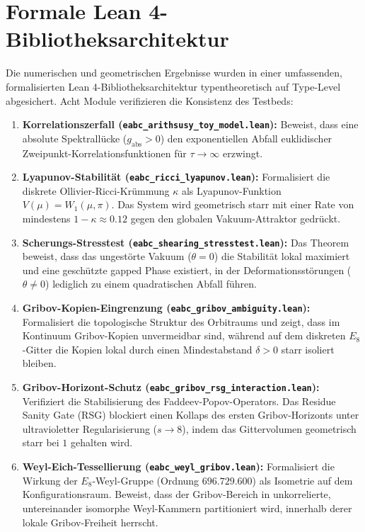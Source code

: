 \documentclass[11pt,a4paper]{article}
\begin{document}
	\section{Formale Lean 4-Bibliotheksarchitektur}
	Die numerischen und geometrischen Ergebnisse wurden in einer umfassenden, formalisierten Lean 4-Bibliotheksarchitektur typentheoretisch auf Type-Level abgesichert. Acht Module verifizieren die Konsistenz des Testbeds:
	\begin{enumerate}
		\item \textbf{Korrelationszerfall (\texttt{eabc\_arithsusy\_toy\_model.lean}):} Beweist, dass eine absolute Spektrallücke ($g_{\text{abs}} > 0$) den exponentiellen Abfall euklidischer Zweipunkt-Korrelationsfunktionen für $\tau \to \infty$ erzwingt.
		\item \textbf{Lyapunov-Stabilität (\texttt{eabc\_ricci\_lyapunov.lean}):} Formalisiert die diskrete Ollivier-Ricci-Krümmung $\kappa$ als Lyapunov-Funktion $V(\mu) = W_1(\mu, \pi)$. Das System wird geometrisch starr mit einer Rate von mindestens $1 - \kappa \approx 0.12$ gegen den globalen Vakuum-Attraktor gedrückt.
		\item \textbf{Scherungs-Stresstest (\texttt{eabc\_shearing\_stresstest.lean}):} Das Theorem beweist, dass das ungestörte Vakuum ($\theta = 0$) die Stabilität lokal maximiert und eine geschützte gapped Phase existiert, in der Deformationsstörungen ($\theta \neq 0$) lediglich zu einem quadratischen Abfall führen.
		\item \textbf{Gribov-Kopien-Eingrenzung (\texttt{eabc\_gribov\_ambiguity.lean}):} Formalisiert die topologische Struktur des Orbitraums und zeigt, dass im Kontinuum Gribov-Kopien unvermeidbar sind, während auf dem diskreten $E_8$-Gitter die Kopien lokal durch einen Mindestabstand $\delta > 0$ starr isoliert bleiben.
		\item \textbf{Gribov-Horizont-Schutz (\texttt{eabc\_gribov\_rsg\_interaction.lean}):} Verifiziert die Stabilisierung des Faddeev-Popov-Operators. Das Residue Sanity Gate (RSG) blockiert einen Kollaps des ersten Gribov-Horizonts unter ultravioletter Regularisierung ($s \to 8$), indem das Gittervolumen geometrisch starr bei $1$ gehalten wird.
		\item \textbf{Weyl-Eich-Tessellierung (\texttt{eabc\_weyl\_gribov.lean}):} Formalisiert die Wirkung der $E_8$-Weyl-Gruppe (Ordnung $696.729.600$) als Isometrie auf dem Konfigurationsraum. Beweist, dass der Gribov-Bereich in unkorrelierte, untereinander isomorphe Weyl-Kammern partitioniert wird, innerhalb derer lokale Gribov-Freiheit herrscht.

\end{enumerate}
\end{document}
